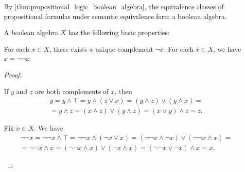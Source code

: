 \begin{example}\label{ex:boolean_algebra}
  By \cref{thm:propositional_logic_boolean_algebra}, the equivalence classes of propositional formulas under semantic equivalence form a boolean algebra.
\end{example}

\begin{proposition}\label{thm:boolean_algebra_properties}
  A boolean algebra \( X \) has the following basic properties:
  \begin{propenum}
     For each \( x \in X \), there exists a unique complement \( \neg x \).
     For each \( x \in X \), we have \( x = \neg \neg x \).
  \end{propenum}
\end{proposition}
\begin{proof}\mbox{}
  \begin{itemize}
     If \( y \) and \( z \) are both complements of \( x \), then
    \begin{align*}
      y
      =
      y \land \top
      =
      y \land (z \lor x)
      =
      (y \land z) \lor (y \land x)
      = \\ =
      y \land z
      =
      (x \land z) \lor (y \land z)
      =
      (x \lor y) \land z
      =
      z.
    \end{align*}

     Fix \( x \in X \). We have
    \begin{align*}
      \neg \neg x
      =
      \neg \neg x \land \top
      =
      \neg \neg x \land (\neg x \lor x)
      =
      (\neg \neg x \land \neg x) \lor (\neg \neg x \land x)
      = \\ =
      \neg \neg x \land x
      =
      (\neg \neg x \land x) \lor (\neg x \land x)
      =
      (\neg \neg x \lor \neg x) \land x
      =
      x.
    \end{align*}
  \end{itemize}
\end{proof}

